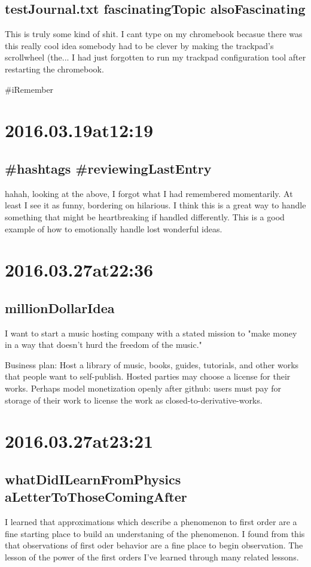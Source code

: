 \subsection*{ testJournal.txt fascinatingTopic alsoFascinating }
This is truly some kind of shit. I cant type on my chromebook becasue there was this really cool idea somebody had to be clever by making the trackpad's scrollwheel (the... I had just forgotten to run my trackpad configuration tool after restarting the chromebook.

\#iRemember

\section*{ 2016.03.19at12:19 }
\subsection*{ \#hashtags \#reviewingLastEntry }
hahah, looking at the above, I forgot what I had remembered momentarily. At least I see it as funny, bordering on hilarious. I think this is a great way to handle something that might be heartbreaking if handled differently. This is a good example of how to emotionally handle lost wonderful ideas. 

\section*{ 2016.03.27at22:36 }
\subsection*{ millionDollarIdea }
I want to start a music hosting company with a stated mission to "make money in a way that doesn't hurd the freedom of the music."

Business plan:
Host a library of music, books, guides, tutorials, and other works that people want to self-publish. Hosted parties may choose a license for their works. Perhaps model monetization openly after github: users must pay for storage of their work to license the work as closed-to-derivative-works. 

\section*{ 2016.03.27at23:21 }
\subsection*{ whatDidILearnFromPhysics aLetterToThoseComingAfter }
I learned that approximations which describe a phenomenon to first order are a fine starting place to build an understaning of the phenomenon. I found from this that observations of first oder behavior are a fine place to begin observation. The lesson of the power of the first orders I've learned through many related lessons.

